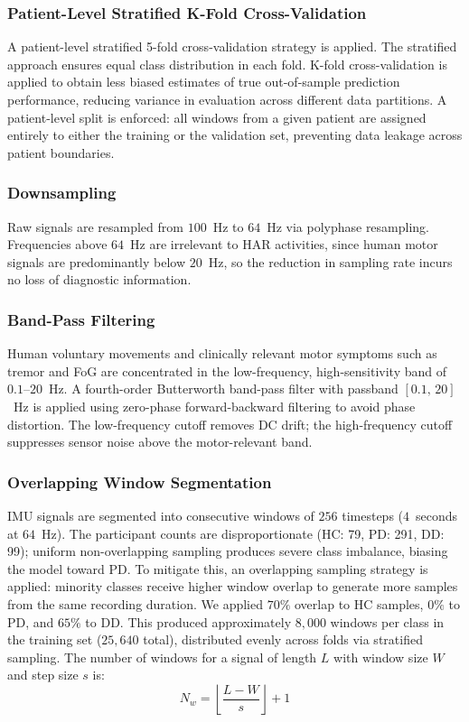 \documentclass[pmlr]{jmlr}
\begin{document}
\subsubsection{Patient-Level Stratified K-Fold Cross-Validation}

A patient-level stratified 5-fold cross-validation strategy is
applied. The stratified approach ensures equal class distribution in
each fold. K-fold cross-validation is applied to obtain less biased
estimates of true out-of-sample prediction performance, reducing
variance in evaluation across different data partitions. A
patient-level split is enforced: all windows from a given patient are
assigned entirely to either the training or the validation set,
preventing data leakage across patient boundaries.

\subsubsection{Downsampling}

Raw signals are resampled from $100$~Hz to $64$~Hz via polyphase
resampling. Frequencies above $64$~Hz are irrelevant to HAR
activities, since human motor signals are predominantly below
$20$~Hz, so the reduction in sampling rate incurs no loss of
diagnostic information.

\subsubsection{Band-Pass Filtering}

Human voluntary movements and clinically relevant motor symptoms such
as tremor and FoG are concentrated in the low-frequency,
high-sensitivity band of $0.1$--$20$~Hz. A fourth-order Butterworth
band-pass filter with passband $[0.1,\,20]$~Hz is applied using
zero-phase forward-backward filtering to avoid phase distortion. The
low-frequency cutoff removes DC drift; the high-frequency cutoff
suppresses sensor noise above the motor-relevant band.

\subsubsection{Overlapping Window Segmentation}
\label{sec:windowing}

IMU signals are segmented into consecutive windows of $256$
timesteps ($4$~seconds at $64$~Hz). The participant counts are
disproportionate (HC: 79, PD: 291, DD: 99); uniform non-overlapping
sampling produces severe class imbalance, biasing the model toward PD.
To mitigate this, an overlapping sampling strategy is applied:
minority classes receive higher window overlap to generate more samples
from the same recording duration. We applied $70\%$ overlap to HC
samples, $0\%$ to PD, and $65\%$ to DD. This produced approximately
$8{,}000$ windows per class in the training set ($25{,}640$ total),
distributed evenly across folds via stratified sampling. The number of
windows for a signal of length $L$ with window size $W$ and step size
$s$ is:
\begin{equation}
  N_w = \left\lfloor \frac{L - W}{s} \right\rfloor + 1
\end{equation}
\end{document}
